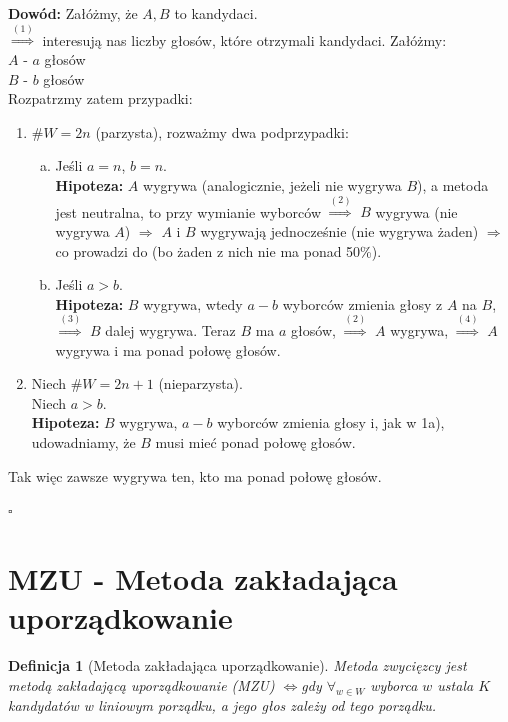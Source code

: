 \documentclass[12pt,a4paper]{article}
\theoremstyle{break}
\newtheorem{definition}{Definicja}[section]
\newcommand{\witw}{$\Leftrightarrow$}
\begin{document}
	\noindent \textbf{Dowód:}
	Załóżmy, że $A,B$ to kandydaci.\\
	$\overset{(1)}{\Rightarrow}$ interesują nas liczby głosów, które otrzymali kandydaci. Załóżmy:\\
	$A$ - $a$ głosów\\
	$B$ - $b$ głosów\\
	Rozpatrzmy zatem przypadki:\\
	\begin{enumerate}[1$^\circ$]
		\item $\# W = 2n$ (parzysta), rozważmy dwa podprzypadki:
		\begin{enumerate}[a)]
			\item Jeśli $a=n$, $b=n$.\\
			\textbf{Hipoteza:} $A$ wygrywa (analogicznie, jeżeli nie wygrywa $B$), a metoda jest neutralna, to przy wymianie wyborców $\overset{(2)}{\Rightarrow}$ $B$ wygrywa (nie wygrywa $A$) $\Rightarrow$ $A$ i $B$ wygrywają jednocześnie (nie wygrywa żaden) $\Rightarrow$ co prowadzi do \faBolt (bo żaden z nich nie ma ponad 50\%).
			
			\item Jeśli $a>b$.\\
			\textbf{Hipoteza:} $B$ wygrywa, wtedy $a-b$ wyborców zmienia głosy z $A$ na $B$, $\overset{(3)}{\Rightarrow}$ $B$ dalej wygrywa. Teraz $B$ ma $a$ głosów, $\overset{(2)}{\Rightarrow}$ $A$ wygrywa, $\overset{(4)}{\Rightarrow}$ $A$ wygrywa i ma ponad połowę głosów.
		\end{enumerate}
		
		\item Niech $\# W = 2n+1$ (nieparzysta).\\
		Niech $a>b$.\\
		\textbf{Hipoteza:} $B$ wygrywa, $a-b$ wyborców zmienia głosy i, jak w 1a), udowadniamy, że $B$ musi mieć ponad połowę głosów.
	\end{enumerate}
	
	Tak więc zawsze wygrywa ten, kto ma ponad połowę głosów.
	\begin{flushright}$\square$\end{flushright}
	
	\newpage
	
	\section{MZU - Metoda zakładająca uporządkowanie}
	\begin{definition}[Metoda zakładająca uporządkowanie]
		Metoda zwycięzcy jest metodą zakładającą uporządkowanie (MZU) \witw gdy $\forall_{w\in W}$ wyborca $w$ ustala $K$ kandydatów w liniowym porządku, a jego głos zależy od tego porządku.
	\end{definition}
	
\end{document}

